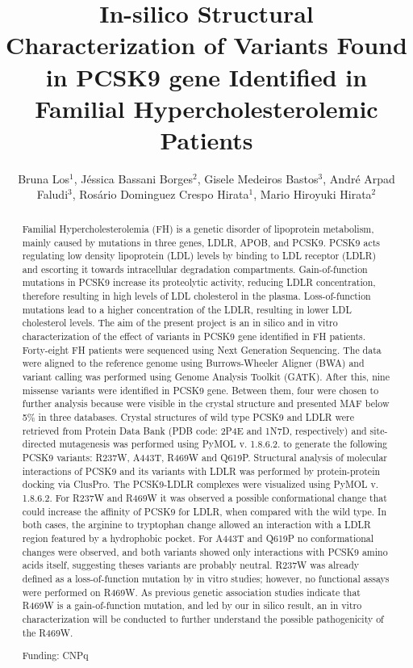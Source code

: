 \documentclass[twoside]{article}
\title{\vspace{-15mm}\fontsize{24pt}{10pt}\selectfont\textbf{In-silico Structural Characterization of Variants Found in PCSK9 gene Identified in Familial Hypercholesterolemic Patients}} %
\author{Bruna Los$^1$, J\'essica Bassani Borges$^2$, Gisele Medeiros Bastos$^3$, Andr\'e Arpad Faludi$^3$, Ros\'ario Dominguez Crespo Hirata$^1$, Mario Hiroyuki Hirata$^2$}
\affil{1 FACULTY OF PHARMACEUTICAL SCIENCES - USP\\ 2 FACULTY OF PHARMACEUTICAL SCIENCES - USP AND DANTE PAZZANESE INSTITUTE OF CARDIOLOGY\\ 3 DANTE PAZZANESE INSTITUTE OF CARDIOLOGY\\ }
\date{}
\begin{document}
\maketitle %

\thispagestyle{fancy} %


\begin{abstract}
Familial Hypercholesterolemia (FH) is a genetic disorder of lipoprotein metabolism, mainly caused by mutations in three genes, LDLR, APOB, and PCSK9. PCSK9 acts regulating low density lipoprotein (LDL) levels by binding to LDL receptor (LDLR) and escorting it towards intracellular degradation compartments. Gain-of-function mutations in PCSK9 increase its proteolytic activity, reducing LDLR concentration, therefore resulting in high levels of LDL cholesterol in the plasma. Loss-of-function mutations lead to a higher concentration of the LDLR, resulting in lower LDL cholesterol levels. The aim of the present project is an in silico and in vitro characterization of the effect of variants in PCSK9 gene identified in FH patients. Forty-eight FH patients were sequenced using Next Generation Sequencing. The data were aligned to the reference genome using Burrows-Wheeler Aligner (BWA) and variant calling was performed using Genome Analysis Toolkit (GATK). After this, nine missense variants were identified in PCSK9 gene. Between them, four were chosen to further analysis because were visible in the crystal structure and presented MAF below 5\% in three databases. Crystal structures of wild type PCSK9 and LDLR were retrieved from Protein Data Bank (PDB code: 2P4E and 1N7D, respectively) and site-directed mutagenesis was performed using PyMOL v. 1.8.6.2. to generate the following PCSK9 variants: R237W, A443T, R469W and Q619P. Structural analysis of molecular interactions of PCSK9 and its variants with LDLR was performed by protein-protein docking via ClusPro. The PCSK9-LDLR complexes were visualized using PyMOL v. 1.8.6.2.  For R237W and R469W it was observed a possible conformational change that could increase the affinity of PCSK9 for LDLR, when compared with the wild type. In both cases, the arginine to tryptophan change allowed an interaction with a LDLR region featured by a hydrophobic pocket. For A443T and Q619P no conformational changes were observed, and both variants showed only interactions with PCSK9 amino acids itself, suggesting theses variants are probably neutral. R237W was already defined as a loss-of-function mutation by in vitro studies; however, no functional assays were performed on R469W. As previous genetic association studies indicate that R469W is a gain-of-function mutation, and led by our in silico result, an in vitro characterization will be conducted to further understand the possible pathogenicity of the R469W.

Funding: CNPq
\end{abstract}
\end{document}
